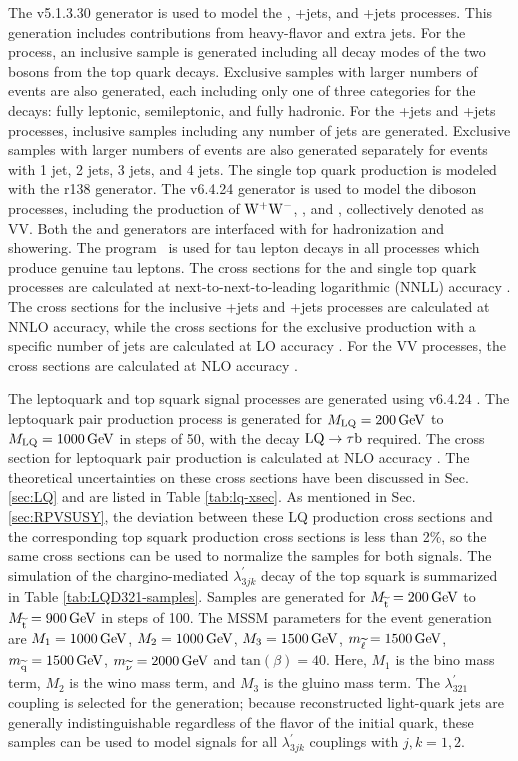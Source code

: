 The \MADGRAPH v5.1.3.30 generator \cite{MadGraph} is used to model the \ttbar, \W+jets, and \Z+jets processes. This generation includes contributions from heavy-flavor and extra jets. For the \ttbar process, an inclusive sample is generated including all decay modes of the two \W bosons from the top quark decays. Exclusive samples with larger numbers of events are also generated, each including only one of three categories for the \W decays: fully leptonic, semileptonic, and fully hadronic. For the \W+jets and \Z+jets processes, inclusive samples including any number of jets are generated. Exclusive samples with larger numbers of events are also generated separately for events with 1 jet, 2 jets, 3 jets, and 4 jets. The single top quark production is modeled with the  r138 \cite{POWHEG2,POWHEG:singlet,POWHEG:singletW} generator. The \PYTHIA v6.4.24 generator \cite{Sjostrand:2006za} is used to model the diboson processes, including the production of $\mathrm{W}^{+}\mathrm{W}^{-}$, \Wpm\Z, and \Z\Z, collectively denoted as VV. Both the \MADGRAPH and \POWHEG generators are interfaced with \PYTHIA for hadronization and showering. The \TAUOLA program~\cite{TAUOLA} is used for tau lepton decays in all processes which produce genuine tau leptons. The cross sections for the \ttbar and single top quark processes are calculated at next-to-next-to-leading logarithmic (NNLL) accuracy \cite{TOPCrossSec}. The cross sections for the inclusive \W+jets and \Z+jets processes are calculated at NNLO accuracy, while the cross sections for the exclusive production with a specific number of jets are calculated at LO accuracy \cite{FEWZ}. For the VV processes, the cross sections are calculated at NLO accuracy \cite{MCFM}.

The leptoquark and top squark signal processes are generated using \PYTHIA v6.4.24 \cite{Sjostrand:2006za}. The leptoquark pair production process is generated for $M_{\text{LQ}}=200\,\text{Ge\hspace{-.08em}V}$ to $M_{\text{LQ}}=1000\,\text{Ge\hspace{-.08em}V}$ in steps of 50\GeV, with the decay $\text{LQ} \rightarrow \tau \mathrm{b}$ required. The cross section for leptoquark pair production is calculated at NLO accuracy \cite{LQxsec}. The theoretical uncertainties on these cross sections have been discussed in Sec. \ref{sec:LQ} and are listed in Table \ref{tab:lq-xsec}. As mentioned in Sec. \ref{sec:RPVSUSY}, the deviation between these LQ production cross sections and the corresponding top squark production cross sections is less than 2\%, so the same cross sections can be used to normalize the samples for both signals. The simulation of the chargino-mediated $\lambda_{3jk}^{\prime}$ decay of the top squark is summarized in Table \ref{tab:LQD321-samples}. Samples are generated for $M_{\widetilde{\mathrm{t}}}=200\,\text{Ge\hspace{-.08em}V}$ to $M_{\widetilde{\mathrm{t}}}=900\,\text{Ge\hspace{-.08em}V}$ in steps of 100\GeV. The MSSM parameters for the event generation are $M_1=1000\,\text{Ge\hspace{-.08em}V}$, $M_2=1000\,\text{Ge\hspace{-.08em}V}$, $M_3=1500\,\text{Ge\hspace{-.08em}V}$, $m_{\widetilde{\mathrm{\ell}}}=1500\,\text{Ge\hspace{-.08em}V}$, $m_{\widetilde{\mathrm{q}}}=1500\,\text{Ge\hspace{-.08em}V}$, $m_{\widetilde{\nu}}=2000\,\text{Ge\hspace{-.08em}V}$ and $\text{tan}(\beta)=40$. Here, $M_1$ is the bino mass term, $M_2$ is the wino mass term, and $M_3$ is the gluino mass term. The $\lambda_{321}^{\prime}$ coupling is selected for the generation; because reconstructed light-quark jets are generally indistinguishable regardless of the flavor of the initial quark, these samples can be used to model signals for all $\lambda_{3jk}^{\prime}$ couplings with $j,k=1,2$.

